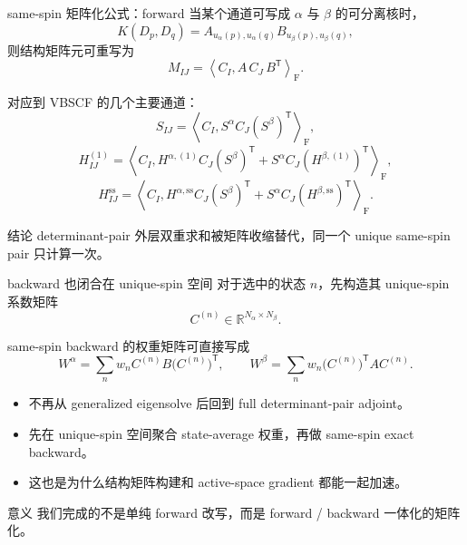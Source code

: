 \documentclass[aspectratio=169,professionalfonts]{ctexbeamer}
\newcommand{\Frob}[2]{\left\langle #1, #2 \right\rangle_{\mathrm F}}
\newcommand{\Na}{N_{\alpha}}
\newcommand{\Nb}{N_{\beta}}
\newcommand{\Cmat}{C}
\begin{document}
\begin{frame}{same-spin 矩阵化公式：forward}
  \small
  当某个通道可写成 \(\alpha\) 与 \(\beta\) 的可分离核时，
  \[
  K(D_p,D_q)
  =
  A_{u_{\alpha}(p),u_{\alpha}(q)}
  B_{u_{\beta}(p),u_{\beta}(q)},
  \]
  则结构矩阵元可重写为
  \[
  M_{IJ}
  =
  \Frob{\Cmat_I}{A\, \Cmat_J\, B^\mathsf{T}}.
  \]

  \vspace{0.4em}
  对应到 VBSCF 的几个主要通道：
  \[
  S_{IJ}
  =
  \Frob{\Cmat_I}{S^\alpha \Cmat_J (S^\beta)^\mathsf{T}},
  \]
  \[
  H^{(1)}_{IJ}
  =
  \Frob{\Cmat_I}{
    H^{\alpha,(1)} \Cmat_J (S^\beta)^\mathsf{T}
    +
    S^\alpha \Cmat_J (H^{\beta,(1)})^\mathsf{T}},
  \]
  \[
  H^{\mathrm{ss}}_{IJ}
  =
  \Frob{\Cmat_I}{
    H^{\alpha,\mathrm{ss}} \Cmat_J (S^\beta)^\mathsf{T}
    +
    S^\alpha \Cmat_J (H^{\beta,\mathrm{ss}})^\mathsf{T}}.
  \]

  \begin{block}{结论}
    determinant-pair 外层双重求和被矩阵收缩替代，同一个 unique same-spin pair 只计算一次。
  \end{block}
\end{frame}

\begin{frame}{backward 也闭合在 unique-spin 空间}
  \small
  对于选中的状态 \(n\)，先构造其 unique-spin 系数矩阵
  \[
  \Cmat^{(n)} \in \mathbb{R}^{\Na\times\Nb}.
  \]

  same-spin backward 的权重矩阵可直接写成
  \[
  W^\alpha
  =
  \sum_n w_n \Cmat^{(n)} B \bigl(\Cmat^{(n)}\bigr)^\mathsf{T},
  \qquad
  W^\beta
  =
  \sum_n w_n \bigl(\Cmat^{(n)}\bigr)^\mathsf{T} A \Cmat^{(n)}.
  \]

  \begin{itemize}
    \item 不再从 generalized eigensolve 后回到 full determinant-pair adjoint。
    \item 先在 unique-spin 空间聚合 state-average 权重，再做 same-spin exact backward。
    \item 这也是为什么结构矩阵构建和 active-space gradient 都能一起加速。
  \end{itemize}

  \begin{block}{意义}
    我们完成的不是单纯 forward 改写，而是 forward / backward 一体化的矩阵化。
  \end{block}
\end{frame}
\end{document}
